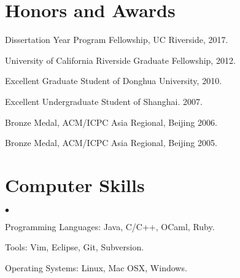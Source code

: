 \documentclass[margin,line]{res}
\newenvironment{list2}{
  \begin{list}{$\bullet$}{%
      \setlength{\itemsep}{0in}
      \setlength{\parsep}{0in} \setlength{\parskip}{0in}
      \setlength{\topsep}{0in} \setlength{\partopsep}{0in} 
      \setlength{\leftmargin}{0.2in}}}{\end{list}}
\begin{document}
\begin{resume}
\section{\sc Honors and Awards} 
Dissertation Year Program Fellowship, UC Riverside, 2017.

\vspace*{-2.5mm}
University of California Riverside Graduate Fellowship, 2012.

\vspace*{-2.5mm}
Excellent Graduate Student of Donghua University, 2010.

\vspace*{-2.5mm}
Excellent Undergraduate Student of Shanghai. 2007.

\vspace*{-2.5mm}
Bronze Medal, ACM/ICPC Asia Regional, Beijing 2006.

\vspace*{-2.5mm}
Bronze Medal, ACM/ICPC Asia Regional, Beijing 2005.



\section{\sc Computer Skills} 
\begin{list2}
\item Programming Languages: Java, C/C++, OCaml, Ruby.
\item Tools: Vim, Eclipse, Git, Subversion.
\item Operating Systems: Linux, Mac OSX, Windows.
\end{list2}



\end{resume}
\end{document}
